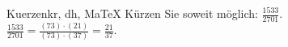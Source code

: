 \begin{MAufgabe}{Kuerzen}{kr, dh, MaTeX}
K\"urzen Sie soweit m\"oglich: $\frac{1533}{2701}$.\\ 
\ifLsg\MLoesung
\quad $\frac{1533}{2701}=\frac{(73)\cdot(21)}{(73)\cdot(37)}=\frac{21}{37}$.\else\relax\fi
 \end{MAufgabe}